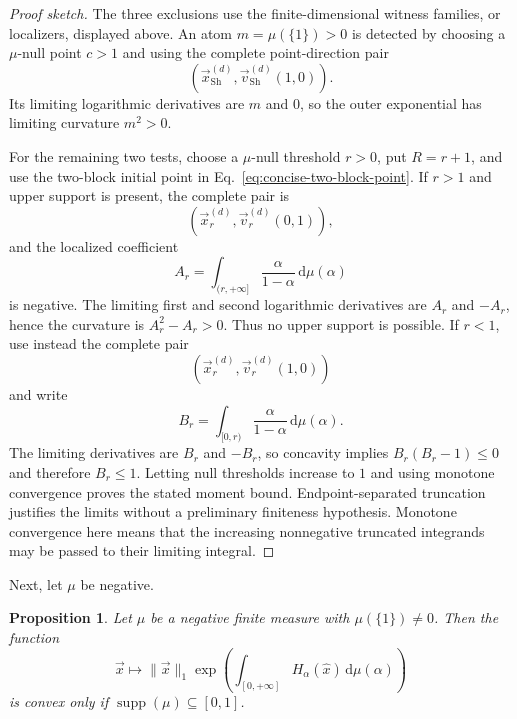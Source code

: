 \documentclass[aps,pra,11pt,onecolumn,nofootinbib,tightenlines]{revtex4-2}
\newtheorem{proposition}[theorem]{Proposition}
\theoremstyle{definition}
\def\d{\mathrm{d}}
\begin{document}
\begin{proof}[Proof sketch]
The three exclusions use the finite-dimensional witness families, or
localizers, displayed above.  An atom
$m=\mu(\{1\})>0$ is detected by choosing a $\mu$-null point $c>1$ and using
the complete point-direction pair
\begin{equation}
\left(
\vec{x}_{\mathrm{Sh}}^{(d)},
\vec{v}_{\mathrm{Sh}}^{(d)}(1,0)
\right).
\label{eq:positive-Shannon-witness-pair}
\end{equation}
Its limiting logarithmic derivatives are $m$ and $0$, so the outer exponential
has limiting curvature $m^2>0$.

For the remaining two tests, choose a $\mu$-null threshold $r>0$, put
$R=r+1$, and use the two-block initial point in
Eq.~\eqref{eq:concise-two-block-point}.  If $r>1$ and upper support is present,
the complete pair is
\begin{equation}
\left(
\vec{x}_r^{(d)},
\vec{v}_r^{(d)}(0,1)
\right),
\label{eq:positive-upper-witness-pair}
\end{equation}
and the localized coefficient
\[
A_r=\int_{(r,+\infty]}\frac{\alpha}{1-\alpha}\,\d\mu(\alpha)
\]
is negative.  The limiting first and second logarithmic derivatives are $A_r$
and $-A_r$, hence the curvature is $A_r^2-A_r>0$.  Thus no upper support is
possible.  If $r<1$, use instead the complete pair
\begin{equation}
\left(
\vec{x}_r^{(d)},
\vec{v}_r^{(d)}(1,0)
\right)
\label{eq:positive-lower-witness-pair}
\end{equation}
and write
\[
B_r=\int_{[0,r)}\frac{\alpha}{1-\alpha}\,\d\mu(\alpha).
\]
The limiting derivatives are $B_r$ and $-B_r$, so concavity implies
$B_r(B_r-1)\leq0$ and therefore $B_r\leq1$.
Letting null thresholds increase to $1$ and using monotone convergence proves
the stated moment bound.  Endpoint-separated truncation justifies the limits
without a preliminary finiteness hypothesis.
Monotone convergence here means that the increasing nonnegative truncated
integrands may be passed to their limiting integral.
\end{proof}

Next, let $\mu$ be negative.

\begin{proposition}
\label{prop:no-alpha-one}
Let $\mu$ be a negative finite measure with $\mu(\{1\})\neq0$.  Then the function
\begin{equation}
\vec{x}\longmapsto\|\vec{x}\|_1
\exp\!\left(\int_{[0,+\infty]}H_\alpha(\hat{x})\,
\d\mu(\alpha)\right)
\end{equation}
is convex only if $\operatorname{supp}(\mu)\subseteq[0,1]$.
\end{proposition}
\end{document}
